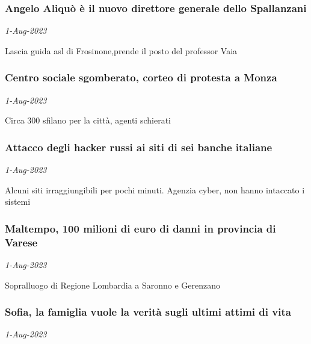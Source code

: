 \subsubsection{Angelo Aliqu\`{o} \`{e} il nuovo direttore generale dello Spallanzani \href{https://www.ansa.it/sito/notizie/cronaca/2023/08/01/angelo-aliquo-e-il-nuovo-direttore-generale-dello-spallanzani_7735eb39-0ad7-438d-892a-6ef8a74d99b9.html}{}}
\textit{1-Aug-2023}

Lascia guida asl di Frosinone,prende il posto del professor Vaia
\subsubsection{Centro sociale sgomberato, corteo di protesta a Monza \href{https://www.ansa.it/sito/notizie/cronaca/2023/08/01/centro-sociale-sgomberato-corteo-di-protesta-a-monza_0743f18c-8a9f-4281-8c2a-082c334c09ec.html}{}}
\textit{1-Aug-2023}

Circa 300 sfilano per la citt\`{a}, agenti schierati
\subsubsection{Attacco degli hacker russi ai siti di sei banche italiane \href{https://www.ansa.it/sito/notizie/cronaca/2023/08/01/attacco-degli-hacker-russi-ai-siti-di-sei-banche-italiane_19c36392-4158-4541-a1f9-9e30ae8c2d3c.html}{}}
\textit{1-Aug-2023}

Alcuni siti irraggiungibili per pochi minuti. Agenzia cyber, non hanno intaccato i sistemi
\subsubsection{Maltempo, 100 milioni di euro di danni in provincia di Varese \href{https://www.ansa.it/sito/notizie/cronaca/2023/08/01/maltempo-100-milioni-di-euro-di-danni-in-provincia-di-varese_3f2622d4-9ae1-4d20-a1bb-85e9ba9695b1.html}{}}
\textit{1-Aug-2023}

Sopralluogo di Regione Lombardia a Saronno e Gerenzano
\subsubsection{Sofia, la famiglia vuole la verit\`{a} sugli ultimi attimi di vita \href{https://www.ansa.it/sito/notizie/cronaca/2023/08/01/sofia-la-famiglia-vuole-la-verita-sugli-ultimi-attimi-di-vita_34b1eb96-a0f6-498d-a06a-209a65335882.html}{}}
\textit{1-Aug-2023}

